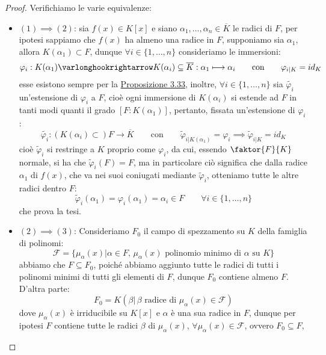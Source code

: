 \documentclass[11pt]{scrartcl}
\begin{document}
\begin{proof}
    Verifichiamo le varie equivalenze:
    \begin{itemize}
        \item \underline{\textbf{$(1)\implies (2)$}}: sia $f(x) \in K[x]$ e siano $\alpha_1,\ldots,\alpha_n \in \overline K$ le radici di $F$, per ipotesi sappiamo che $f(x)$ ha almeno una radice in $F$, supponiamo sia $\alpha_1$, allora $K(\alpha_1) \subset F$, dunque
        $\forall i \in \{1,\ldots,n\}$ consideriamo le immersioni:
        \[ \varphi_i : K(\alpha_1) \varlonghookrightarrow K(\alpha_i) \subseteq \overline K : \alpha_1 \longmapsto \alpha_i \qquad \text{con} \qquad \varphi_{i|K} = id_K
            \]
        esse esistono sempre per la \hyperref[3.33]{Proposizione 3.33}, inoltre, $\forall i \in \{1,\ldots,n\}$ sia $\widetilde{\varphi_i}$ un'estensione di $\varphi_i$ a $F$, cioè ogni immersione di $K(\alpha_i)$ si estende ad $F$
        in tanti modi quanti il grado $[F : K(\alpha_1)]$, pertanto, fissata un'estensione di $\varphi_i$:
        \[ \widetilde{\varphi_i} : (K(\alpha_i) \subset)F \longrightarrow \overline K \qquad \text{con} \qquad \widetilde{\varphi}_{i|K(\alpha_1)} = \varphi_i \implies \widetilde{\varphi}_{i|K} = id_K
            \]
        cioè $\widetilde{\varphi}_i$ si restringe a $K$ proprio come $\varphi_i$, da cui, essendo $\faktor{F}{K}$ normale, si ha che $\widetilde{\varphi}_i(F) = F$, ma in particolare ciò significa che
        dalla radice $\alpha_1$ di $f(x)$, che va nei suoi coniugati mediante $\widetilde{\varphi}_i$, otteniamo tutte le altre radici dentro $F$:
        \[ \widetilde{\varphi}_i(\alpha_1) = \varphi_i(\alpha_1) = \alpha_i \in F \qquad \forall i \in \{1,\ldots,n\}
            \]
        che prova la tesi.
        \item \underline{\textbf{$(2)\implies (3)$}}: Consideriamo $F_0$ il campo di spezzamento su $K$ della famiglia di polinomi:
        \[ \mathcal{F} = \{\mu_\alpha(x) | \alpha \in F, \, \text{$\mu_\alpha(x)$ polinomio minimo di $\alpha$ su $K$}\}
            \]
        abbiamo che $F \subseteq F_0$, poiché abbiamo aggiunto tutte le radici di tutti i polinomi minimi di tutti gli elementi di $F$, dunque $F_0$ contiene almeno $F$.
        D'altra parte:
        \[ F_0 = K(\beta | \, \text{$\beta$ radice di $\mu_\alpha(x) \in \mathcal{F}$})
            \]
        dove $\mu_\alpha(x)$ è irriducibile su $K[x]$ e $\alpha$ è una sua radice in $F$, dunque per ipotesi $F$ contiene tutte le radici $\beta$ di $\mu_\alpha(x)$, $\forall \mu_\alpha(x) \in \mathcal{F}$, ovvero $F_0 \subseteq F$,

\end{itemize}
\end{proof}
\end{document}
